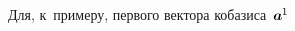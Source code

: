 \begin{otherlanguage}{russian}

\begin{comment} %
\vspace{-0.5em}\[
\bm{a}_i \dotp \bm{a}^{\hspace{.1ex}j} \hspace{-0.1ex} = \hspace{-0.2ex}
\scalebox{0.8}[0.8]{$\left[ \begin{array}{ccc}
\bm{a}_1 \hspace{-0.1ex} \dotp \bm{a}^{\hspace{-0.1ex}1} & \bm{a}_1 \hspace{-0.1ex} \dotp \bm{a}^2 & \bm{a}_1 \hspace{-0.1ex} \dotp \bm{a}^3 \\
\bm{a}_2 \hspace{-0.1ex} \dotp \bm{a}^{\hspace{-0.1ex}1} & \bm{a}_2 \hspace{-0.1ex} \dotp \bm{a}^2 & \bm{a}_2 \hspace{-0.1ex} \dotp \bm{a}^3 \\
\bm{a}_3 \hspace{-0.1ex} \dotp \bm{a}^{\hspace{-0.1ex}1} & \bm{a}_3 \hspace{-0.1ex} \dotp \bm{a}^2 & \bm{a}_3 \hspace{-0.1ex} \dotp \bm{a}^3
\end{array} \right]$} \!=\!
\scalebox{0.8}[0.8]{$\left[ \begin{array}{ccc}
1 & 0 & 0 \\
0 & 1 & 0 \\
0 & 0 & 1
\end{array} \right]$} \!=
\hspace{.1ex} \delta_i^{\hspace{.1ex}j}
\]
\end{comment} %

Для, к~примеру, первого вектора кобазиса~${\bm{a}^{\hspace{-0.1ex}1}\hspace{-0.1ex}}$


\end{otherlanguage}
